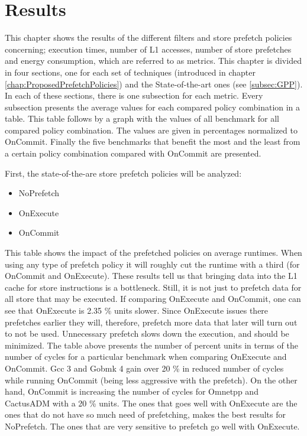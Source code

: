 \chapter{Results}
\label{chap:results}

This chapter shows the results of the different filters and store prefetch policies concerning; execution times, number of L1 accesses, number of store prefetches and
energy consumption, which are referred to as metrics. This chapter is divided in four
sections, one for each set of techniques (introduced in chapter \ref{chap:ProposedPrefetchPolicies}) and the State-of-the-art ones (see \ref{subsec:GPP}). In each of these sections, there is one subsection for each
metric. Every subsection presents the average values for each compared policy combination in a table. This table follows by a graph with the values of all benchmark
for all compared policy combination. The values are given in percentages normalized
to OnCommit. Finally the five benchmarks that benefit the most and the least from
a certain policy combination compared with OnCommit are presented.

First, the state-of-the-are store prefetch policies will be analyzed:
\begin{itemize}
    \item NoPrefetch
    \item OnExecute
    \item OnCommit
\end{itemize}
\resExtime
{}
This table shows the impact of the prefetched policies on average runtimes. When
using any type of prefetch policy it will roughly cut the runtime with a third (for
OnCommit and OnExecute). These results tell us that bringing data into the L1
cache for store instructions is a bottleneck. Still, it is not just to prefetch data for
all store that may be executed. If comparing OnExecute and OnCommit, one can
see that OnExecute is 2.35 \% units slower. Since OnExecute issues there prefetches earlier they will, therefore, prefetch more data that later will turn out to not be used. Unnecessary prefetch slows down the execution, and should be minimized.
The table above presents the number of percent units in terms of the number of
cycles for a particular benchmark when comparing OnExecute and OnCommit. Gcc
3 and Gobmk 4 gain over 20 \% in reduced number of cycles while running OnCommit
(being less aggressive with the prefetch). On the other hand, OnCommit is increasing the number of cycles for Omnetpp and CactusADM with a 20 \% units. The ones that
goes well with OnExecute are the ones that do not have so much need of prefetching,
makes the best results for NoPrefetch. The ones that are very sensitive to prefetch
go well with OnExecute.
\resAcc

